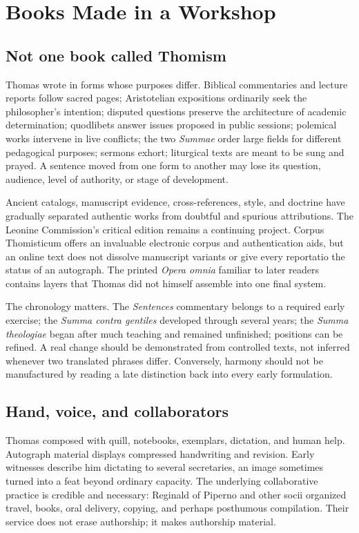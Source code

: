 \section{Books Made in a Workshop}

\subsection{Not one book called Thomism}

Thomas wrote in forms whose purposes differ.  Biblical commentaries and
lecture reports follow sacred pages; Aristotelian expositions ordinarily seek
the philosopher's intention; disputed questions preserve the architecture of
academic determination; quodlibets answer issues proposed in public sessions;
polemical works intervene in live conflicts; the two \emph{Summae} order large
fields for different pedagogical purposes; sermons exhort; liturgical texts
are meant to be sung and prayed.  A sentence moved from one form to another may
lose its question, audience, level of authority, or stage of development.

Ancient catalogs, manuscript evidence, cross-references, style, and doctrine
have gradually separated authentic works from doubtful and spurious
attributions.  The Leonine Commission's critical edition remains a continuing
project.  Corpus Thomisticum offers an invaluable electronic corpus and
authentication aids, but an online text does not dissolve manuscript variants
or give every reportatio the status of an autograph.  The printed \emph{Opera
omnia} familiar to later readers contains layers that Thomas did not himself
assemble into one final system.

The chronology matters.  The \emph{Sentences} commentary belongs to a required
early exercise; the \emph{Summa contra gentiles} developed through several
years; the \emph{Summa theologiae} began after much teaching and remained
unfinished; positions can be refined.  A real change should be demonstrated
from controlled texts, not inferred whenever two translated phrases differ.
Conversely, harmony should not be manufactured by reading a late distinction
back into every early formulation.

\subsection{Hand, voice, and collaborators}

Thomas composed with quill, notebooks, exemplars, dictation, and human help.
Autograph material displays compressed handwriting and revision.  Early
witnesses describe him dictating to several secretaries, an image sometimes
turned into a feat beyond ordinary capacity.  The underlying collaborative
practice is credible and necessary: Reginald of Piperno and other socii
organized travel, books, oral delivery, copying, and perhaps posthumous
compilation.  Their service does not erase authorship; it makes authorship
material.

